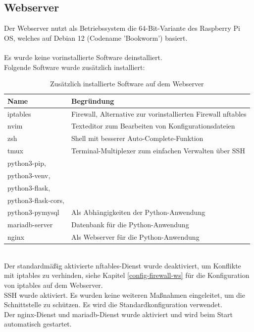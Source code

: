 \documentclass[
    a4paper,
    pagesize,
	pdftex,
    12pt,
]{scrartcl}
\begin{document}
\subsection{Webserver}
Der Webserver nutzt als Betriebssystem die 64-Bit-Variante des Raspberry Pi OS, welches auf Debian 12 (Codename 'Bookworm') basiert.  \\ \\ 
Es wurde keine vorinstallierte Software deinstalliert.\\
Folgende Software wurde zusätzlich installiert: 
\begin{table}[h!]
	\begin{center}
		\label{tab:table2}
		\begin{tabular}{l|l }
			\textbf{Name} & \textbf{Begründung} \\
			\hline
			iptables & Firewall, Alternative zur vorinstallierten Firewall nftables \\
			nvim & Texteditor zum Bearbeiten von Konfigurationsdateien \\
			zsh & Shell mit besserer Auto-Complete-Funktion \\
			tmux & Terminal-Multiplexer zum einfachen Verwalten über SSH \\
			python3-pip,\\ python3-venv, \\ python3-flask,\\ python3-flask-cors, \\ python3-pymysql & Als Abhängigkeiten der Python-Anwendung \\
			mariadb-server & Datenbank für die Python-Anwendung \\
			nginx & Als Webserver für die Python-Anwendung \\
		\end{tabular}
		\caption{Zusätzlich installierte Software auf dem Webserver}
	\end{center}
\end{table}
\\
Der standardmäßig aktivierte nftables-Dienst wurde deaktiviert, um Konflikte mit iptables zu verhinden, siehe Kapitel \ref{config-firewall-ws} für die Konfiguration von iptables auf dem Webserver. \\
SSH wurde aktiviert. Es wurden keine weiteren Maßnahmen eingeleitet, um die Schnittstelle zu  schützen. Es wird die Standardkonfiguration verwendet. \\
Der nginx-Dienst und mariadb-Dienst wurde aktiviert und wird beim Start automatisch gestartet. \\
\end{document}
